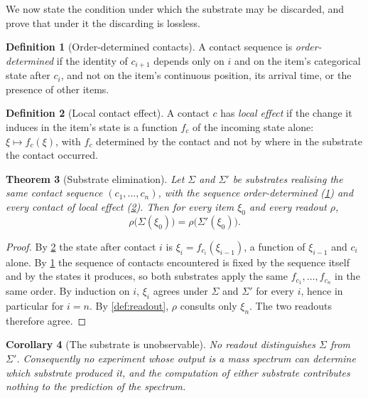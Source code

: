 \documentclass[11pt,a4paper]{article}
\theoremstyle{plain}
\newtheorem{theorem}{Theorem}[section]
\newtheorem{corollary}[theorem]{Corollary}
\theoremstyle{definition}
\newtheorem{definition}[theorem]{Definition}
\theoremstyle{remark}
\newcommand{\Sub}{\Sigma}
\newcommand{\Cont}{c}
\newcommand{\Item}{\xi}
\newcommand{\Read}{\rho}
\begin{document}
We now state the condition under which the substrate may be discarded, and
prove that under it the discarding is lossless.

\begin{definition}[Order-determined contacts]
\label{def:orderdet}
A contact sequence is \emph{order-determined} if the identity of $\Cont_{i+1}$
depends only on $i$ and on the item's categorical state after $\Cont_i$, and not
on the item's continuous position, its arrival time, or the presence of other
items.
\end{definition}

\begin{definition}[Local contact effect]
\label{def:localeffect}
A contact $\Cont$ has \emph{local effect} if the change it induces in the item's
state is a function $f_\Cont$ of the incoming state alone:
$\Item \mapsto f_\Cont(\Item)$, with $f_\Cont$ determined by the contact and not
by where in the substrate the contact occurred.
\end{definition}

\begin{theorem}[Substrate elimination]
\label{thm:elimination}
Let $\Sub$ and $\Sub'$ be substrates realising the same contact sequence
$(\Cont_1,\dots,\Cont_n)$, with the sequence order-determined
(\cref{def:orderdet}) and every contact of local effect
(\cref{def:localeffect}). Then for every item $\Item_0$ and every readout
$\Read$,
\[
\Read\bigl(\Sub(\Item_0)\bigr) = \Read\bigl(\Sub'(\Item_0)\bigr).
\]
\end{theorem}

\begin{proof}
By \cref{def:localeffect} the state after contact $i$ is
$\Item_i = f_{\Cont_i}(\Item_{i-1})$, a function of $\Item_{i-1}$ and $\Cont_i$
alone. By \cref{def:orderdet} the sequence of contacts encountered is fixed by
the sequence itself and by the states it produces, so both substrates apply the
same $f_{\Cont_1},\dots,f_{\Cont_n}$ in the same order. By induction on $i$,
$\Item_i$ agrees under $\Sub$ and $\Sub'$ for every $i$, hence in particular for
$i=n$. By \cref{def:readout}, $\Read$ consults only $\Item_n$. The two readouts
therefore agree.
\end{proof}

\begin{corollary}[The substrate is unobservable]
\label{cor:unobservable}
No readout distinguishes $\Sub$ from $\Sub'$. Consequently no experiment whose
output is a mass spectrum can determine which substrate produced it, and the
computation of either substrate contributes nothing to the prediction of the
spectrum.
\end{corollary}
\end{document}
